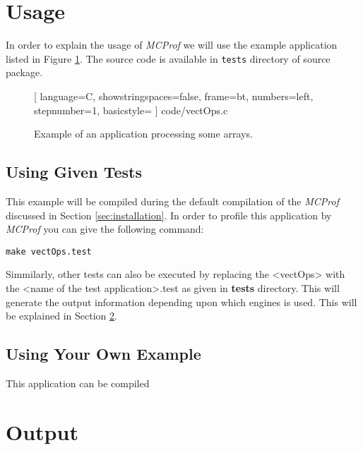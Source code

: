 \documentclass[11pt]{article}
\newcommand{\MCPROF}{\emph{MCProf}}
\begin{document}
\section{Usage}
\label{sec:usage}

In order to explain the usage of \MCPROF{} we will use the example application
listed in Figure \ref{fig:vectOps}. The source code is available in \verb|tests|
directory of source package.

\begin{figure} %
    \centering
%     
    
    [
    language=C,
    showstringspaces=false,
    frame=bt,
    numbers=left,
    stepnumber=1,
    basicstyle=\small %
    ] {code/vectOps.c}
    \caption{Example of an application processing some arrays.}
    \label{fig:vectOps}
\end{figure}


\subsection{Using Given Tests}

This example will be compiled during the default compilation of the
\MCPROF{} discussed in Section \ref{sec:installation}. In order to profile this
application by \MCPROF{} you can give the following command:
        \begin{center}
        \verb|make vectOps.test|
        \end{center}

Simmilarly, other tests can also be executed by replacing the <vectOps> with the
<name of the test application>.test as given in \textbf{tests} directory. This
will generate the output information depending upon which engines is used. This
will be explained in Section \ref{sec:output}.

\subsection{Using Your Own Example}

This application can be compiled 


\section{Output}
\label{sec:output}
\end{document}
